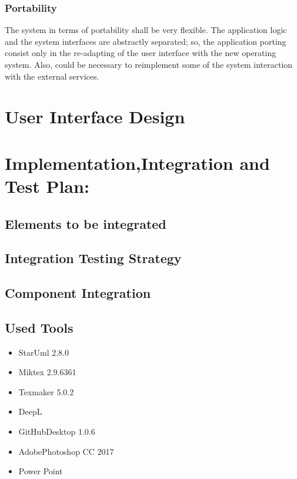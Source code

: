 \documentclass [12pt]{article}
\begin{document}
\subsubsection{Portability}
The system in terms of portability shall be very flexible. The application logic and the system interfaces are abstractly separated; so, the application porting consist only in the re-adapting of the user interface with the new operating system.
Also, could be necessary to reimplement some of the system interaction with the external services.\\

\section{User Interface Design}


\section{Implementation,Integration and Test Plan:}
\subsection{Elements to be integrated}

\subsection{Integration Testing Strategy}

\subsection{Component Integration}

\subsection{Used Tools}
\begin{itemize}
\item StarUml 2.8.0
\item Miktex 2.9.6361
\item Texmaker 5.0.2
\item DeepL
\item GitHubDesktop 1.0.6
\item AdobePhotoshop CC 2017
\item Power Point
\end{itemize}
\end{document}
